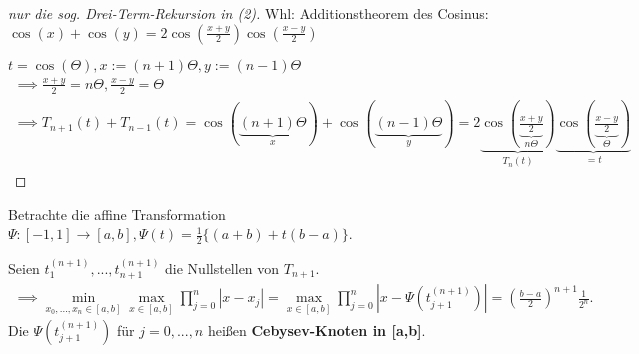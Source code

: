\begin{proof}[nur die sog. Drei-Term-Rekursion in (2)]
	Whl: Additionstheorem des Cosinus: $\cos(x)+\cos(y) = 2\cos\left(\frac{x+y}{2}\right) \cos\left(\frac{x-y}{2}\right)$
	
	$t=\cos(\Theta), x:=(n+1)\Theta, y:=(n-1)\Theta$
	\begin{align*}
		\implies \frac{x+y}{2} = n \Theta, \frac{x-y}{2} = \Theta\\
		\implies T_{n+1}(t) + T_{n-1}(t) = \cos(\underbrace{(n+1)\Theta}_{x}) + \cos(\underbrace{(n-1)\Theta}_{y}) = 2 \underbrace{\cos\left(\underbrace{\frac{x+y}{2}}_{n\Theta}\right)}_{T_n(t)} \underbrace{\cos\left(\underbrace{\frac{x-y}{2}}_{\Theta}\right)}_{=t}
	\end{align*}
\end{proof}

\begin{theorem}
	Betrachte die affine Transformation $\Psi:[-1, 1] \rightarrow [a,b], \Psi(t)=\frac{1}{2} \{(a+b) + t(b-a)\}$.
	
	Seien $t_1^{(n+1)}, ..., t_{n+1}^{(n+1)}$ die Nullstellen von $T_{n+1}$.
	\begin{align*}
		\implies \min_{x_0, ..., x_n \in [a,b]} \max_{x\in [a,b]} \prod_{j=0}^{n} |x-x_j| = \max_{x\in [a,b]} \prod_{j=0}^{n} |x - \Psi(t_{j+1}^{(n+1)})| = \left(\frac{b-a}{2}\right)^{n+1} \frac{1}{2^n}.
	\end{align*}
	Die $\Psi(t_{j+1}^{(n+1)})$ für $j=0, ..., n$ heißen \textbf{Cebysev-Knoten in [a,b]}.
\end{theorem}

